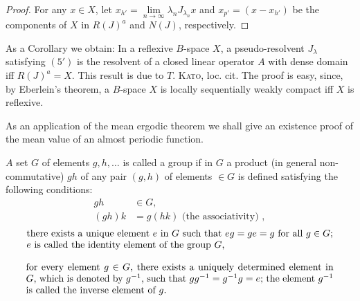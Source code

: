 \begin{proof}
 For any $x \in X$, let $x_{h'} = \lim\limits_{n \to \infty} \lambda_n J_{\lambda_n} x$ and $x_{p'} = (x - x_{h'})$ be the components of $X$ in $R(J)^a$ and $N(J)$, respectively. 
\end{proof}

\begin{remarku} As a Corollary we obtain: In a reflexive $B$-space $X$, a pseudo-resolvent $J_{\lambda}$ satisfying $(5')$ is the resolvent of a closed linear operator $A$ with dense domain iff $R(J)^{a} = X$. This result is due to $T$. \textsc{Kato}, loc. cit. The proof is easy, since, by Eberlein's theorem, a $B$-space $X$ is locally sequentially weakly compact iff $X$ is reflexive. 
\end{remarku}


\label{sec:VIII.5}

As an application of the mean ergodic theorem we shall give an existence proof of the mean value of an almost periodic function. 

\begin{definition}\label{def:VIII.5.Definition.1} $A$ set $G$ of elements $g, h, \ldots$ is called a group if in $G$ a product (in general non-commutative) $gh$ of any pair $(g, h)$ of elements $\in G$ is defined satisfying the following conditions: 
\begin{align}
g h& \in G, \label{eq:VIII.5.1} \\
(g h) k& = g (h k) \text{ (the associativity) }, \label{eq:VIII.5.2}
\end{align}
\begin{equation}\label{eq:VIII.5.3}
\begin{minipage}[b]{0.92\linewidth}
there exists a unique element $e$ in $G$ such that $eg = ge = g$ for all $g \in G$; $e$ is called the identity element of the group $G$,
\end{minipage}
\end{equation}

\begin{equation}\label{eq:VIII.5.4}
\begin{minipage}[b]{0.92\linewidth}
for every element $g \in G$, there exists a uniquely determined element in $G$, which is denoted by $g^{-1}$, such that $gg^{-1} = g^{-1}g = e$; the element $g^{-1}$ is called the inverse element of $g$.
\end{minipage}
\end{equation}
\end{definition}


